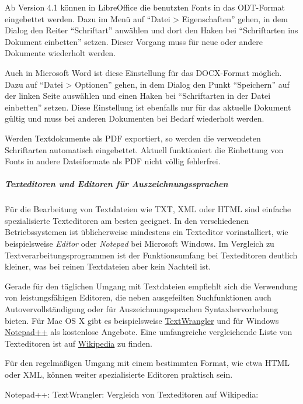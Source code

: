 Ab Version 4.1 können in LibreOffice die benutzten Fonts in das ODT-Format eingebettet werden. Dazu im Menü auf "`Datei > Eigenschaften"' gehen, in dem Dialog den Reiter "`Schriftart"' anwählen und dort den Haken bei "`Schriftarten ins Dokument einbetten"' setzen. Dieser Vorgang muss für neue oder andere Dokumente wiederholt werden. 

Auch in Microsoft Word ist diese Einstellung für das DOCX-Format möglich. Dazu auf "`Datei > Optionen"' gehen, in dem Dialog den Punkt "`Speichern"' auf der linken Seite auswählen und einen Haken bei "`Schriftarten in der Datei einbetten"' setzen. Diese Einstellung ist ebenfalls nur für das aktuelle Dokument gültig und muss bei anderen Dokumenten bei Bedarf wiederholt werden.

Werden Textdokumente als PDF exportiert, so werden die verwendeten Schriftarten automatisch eingebettet. Aktuell funktioniert die Einbettung von Fonts in andere Dateiformate als PDF nicht völlig fehlerfrei.


\subparagraph{Texteditoren und Editoren für Auszeichnungssprachen}
Für die Bearbeitung von Textdateien wie TXT, XML oder HTML sind einfache spezialisierte Texteditoren am besten geeignet. In den verschiedenen Betriebssystemen ist üblicherweise mindestens ein Texteditor vorinstalliert, wie beispielsweise \emph{Editor} oder \emph{Notepad} bei Microsoft Windows. Im Vergleich zu Textverarbeitungsprogrammen ist der Funktionsumfang bei Texteditoren deutlich kleiner, was bei reinen Textdateien aber kein Nachteil ist.

Gerade für den täglichen Umgang mit Textdateien empfiehlt sich die Verwendung von leistungsfähigen Editoren, die neben ausgefeilten Suchfunktionen auch Autovervollständigung oder für Auszeichnungssprachen Syntaxhervorhebung bieten. Für Mac OS X gibt es beispielsweise \href{http://www.barebones.com/products/textwrangler/}{TextWrangler} und für Windows \href{http://www.notepad-plus-plus.org/}{Notepad++} als kostenlose Angebote. Eine umfangreiche vergleichende Liste von Texteditoren ist auf \href{http://en.wikipedia.org/wiki/Comparison_of_text_editors}{Wikipedia} zu finden. 

Für den regelmäßigen Umgang mit einem bestimmten Format, wie etwa HTML oder XML, können weiter spezialisierte Editoren praktisch sein.

\begin{flushleft}
	Notepad++: 
	TextWrangler: 
	Vergleich von Texteditoren auf Wikipedia: 
\end{flushleft}


